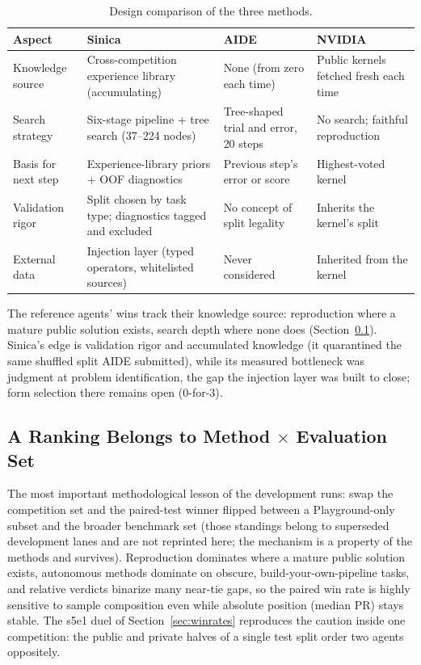 \documentclass[11pt,a4paper]{article}
\begin{document}
\begin{table}[htbp]
\centering\footnotesize
\setlength{\tabcolsep}{4pt}
\caption{Design comparison of the three methods.}
\label{tab:threeway}
\begin{tabular}{@{}L{3.2cm}L{4.2cm}L{3.4cm}L{3.6cm}@{}}
\toprule
\textbf{Aspect} & \textbf{Sinica} & \textbf{AIDE} & \textbf{NVIDIA} \\
\midrule
Knowledge source & Cross-competition experience library (accumulating) & None (from zero each time) & Public kernels fetched fresh each time \\
Search strategy & Six-stage pipeline + tree search (37--224 nodes) & Tree-shaped trial and error, 20 steps & No search; faithful reproduction \\
Basis for next step & Experience-library priors + OOF diagnostics & Previous step's error or score & Highest-voted kernel \\
Validation rigor & Split chosen by task type; diagnostics tagged and excluded & No concept of split legality & Inherits the kernel's split \\
External data & Injection layer (typed operators, whitelisted sources) & Never considered & Inherited from the kernel \\
\bottomrule
\end{tabular}
\end{table}

The reference agents' wins track their knowledge source: reproduction where a mature public solution exists, search depth where none does (Section~\ref{sec:reversal}). Sinica's edge is validation rigor and accumulated knowledge (it quarantined the same shuffled split AIDE submitted), while its measured bottleneck was judgment at problem identification, the gap the injection layer was built to close; form selection there remains open (0-for-3).

\subsection{A Ranking Belongs to Method $\times$ Evaluation Set}
\label{sec:reversal}

The most important methodological lesson of the development runs: swap the competition set and the paired-test winner flipped between a Playground-only subset and the broader benchmark set (those standings belong to superseded development lanes and are not reprinted here; the mechanism is a property of the methods and survives). Reproduction dominates where a mature public solution exists, autonomous methods dominate on obscure, build-your-own-pipeline tasks, and relative verdicts binarize many near-tie gaps, so the paired win rate is highly sensitive to sample composition even while absolute position (median PR) stays stable. The s5e1 duel of Section~\ref{sec:winrates} reproduces the caution inside one competition: the public and private halves of a single test split order two agents oppositely.
\end{document}
